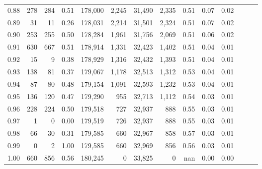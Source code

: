 \begin{tabular}{rrrrrrrrrrrrrr}
0.88 &     278 &    284 &  0.51 &  178,000 &    2,245 &  31,490 &   2,335 &  0.51 &  0.07 &      0.02 \\
0.89 &      31 &     11 &  0.26 &  178,031 &    2,214 &  31,501 &   2,324 &  0.51 &  0.07 &      0.02 \\
0.90 &     253 &    255 &  0.50 &  178,284 &    1,961 &  31,756 &   2,069 &  0.51 &  0.06 &      0.02 \\
0.91 &     630 &    667 &  0.51 &  178,914 &    1,331 &  32,423 &   1,402 &  0.51 &  0.04 &      0.01 \\
0.92 &      15 &      9 &  0.38 &  178,929 &    1,316 &  32,432 &   1,393 &  0.51 &  0.04 &      0.01 \\
0.93 &     138 &     81 &  0.37 &  179,067 &    1,178 &  32,513 &   1,312 &  0.53 &  0.04 &      0.01 \\
0.94 &      87 &     80 &  0.48 &  179,154 &    1,091 &  32,593 &   1,232 &  0.53 &  0.04 &      0.01 \\
0.95 &     136 &    120 &  0.47 &  179,290 &      955 &  32,713 &   1,112 &  0.54 &  0.03 &      0.01 \\
0.96 &     228 &    224 &  0.50 &  179,518 &      727 &  32,937 &     888 &  0.55 &  0.03 &      0.01 \\
0.97 &       1 &      0 &  0.00 &  179,519 &      726 &  32,937 &     888 &  0.55 &  0.03 &      0.01 \\
0.98 &      66 &     30 &  0.31 &  179,585 &      660 &  32,967 &     858 &  0.57 &  0.03 &      0.01 \\
0.99 &       0 &      2 &  1.00 &  179,585 &      660 &  32,969 &     856 &  0.56 &  0.03 &      0.01 \\
1.00 &     660 &    856 &  0.56 &  180,245 &        0 &  33,825 &       0 &   nan &  0.00 &      0.00 \\
\bottomrule
\end{tabular}
